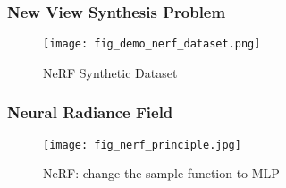 \begin{frame}
    \frametitle{New View Synthesis Problem}
    \begin{figure}[H]
        \texttt{[image: fig\_demo\_nerf\_dataset.png]}
        \caption[short]{NeRF Synthetic Dataset}
    \end{figure}
\end{frame}

\begin{frame}
\frametitle{Neural Radiance Field\cite{mildenhallNeRFRepresentingScenes2020}}
\begin{figure}
    \texttt{[image: fig\_nerf\_principle.jpg]}
    \caption[short]{NeRF: change the sample function to MLP}
\end{figure}
\end{frame}
